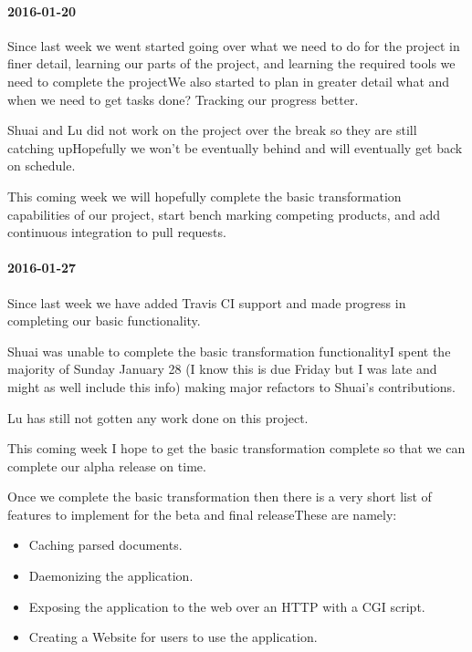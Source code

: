 \paragraph{2016-01-20}

Since last week we went started going over what we need to do for the project in finer detail, learning our parts of the project, and learning the required tools we need to complete the projectWe also started to plan in greater detail what and when we need to get tasks done? Tracking our progress better.

Shuai and Lu did not work on the project over the break so they are still catching upHopefully we won't be eventually behind and will eventually get back on schedule.

This coming week we will hopefully complete the basic transformation capabilities of our project, start bench marking competing products, and add continuous integration to pull requests.

\paragraph{2016-01-27}

Since last week we have added Travis CI support and made progress in completing our basic functionality.

Shuai was unable to complete the basic transformation functionalityI spent the majority of Sunday January 28 (I know this is due Friday but I was late and might as well include this info) making major refactors to Shuai's contributions.

Lu has still not gotten any work done on this project.

This coming week I hope to get the basic transformation complete so that we can complete our alpha release on time.

Once we complete the basic transformation then there is a very short list of features to implement for the beta and final releaseThese are namely:

\begin{itemize}
  \item Caching parsed documents.
  \item Daemonizing the application.
  \item Exposing the application to the web over an HTTP with a CGI script.
  \item Creating a Website for users to use the application.
\end{itemize}


